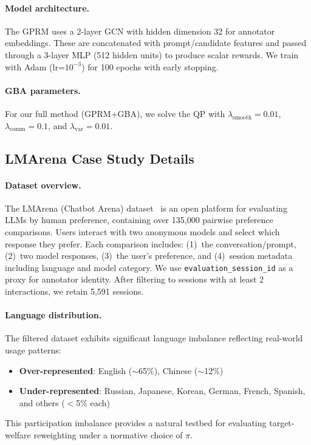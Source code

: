 \documentclass{article}
\theoremstyle{plain}
\theoremstyle{definition}
\theoremstyle{remark}
\begin{document}
\paragraph{Model architecture.}
The GPRM uses a 2-layer GCN with hidden dimension 32 for annotator embeddings. These are concatenated with prompt/candidate features and passed through a 3-layer MLP (512 hidden units) to produce scalar rewards. We train with Adam (lr=$10^{-3}$) for 100 epochs with early stopping.

\paragraph{GBA parameters.}
For our full method (GPRM+GBA), we solve the QP with $\lambda_{\text{smooth}} = 0.01$, $\lambda_{\text{comm}} = 0.1$, and $\lambda_{\text{var}} = 0.01$.

\subsection{LMArena Case Study Details}
\label{app:lmarena-details}

\paragraph{Dataset overview.}
The LMArena (Chatbot Arena) dataset~\citep{chiang2024chatbotarena} is an open platform
for evaluating LLMs by human preference, containing over 135,000 pairwise preference
comparisons. Users interact with two anonymous models and select which response they
prefer. Each comparison includes: (1)~the conversation/prompt, (2)~two model responses,
(3)~the user's preference, and (4)~session metadata including language and model category.
We use \texttt{evaluation\_session\_id} as a proxy for annotator identity. After filtering
to sessions with at least 2 interactions, we retain 5{,}591 sessions.

\paragraph{Language distribution.}
The filtered dataset exhibits significant language imbalance reflecting real-world usage patterns:
\begin{itemize}
    \item \textbf{Over-represented}: English ($\sim$65\%), Chinese ($\sim$12\%)
    \item \textbf{Under-represented}: Russian, Japanese, Korean, German, French, Spanish, and others ($<$5\% each)
\end{itemize}
This participation imbalance provides a natural testbed for evaluating
target-welfare reweighting under a normative choice of $\pi$.
\end{document}
